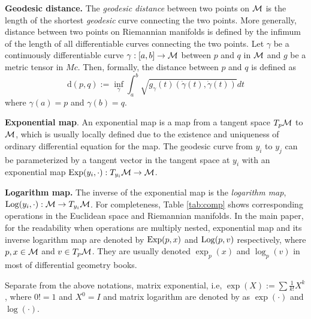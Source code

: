 \textbf{Geodesic distance.} The \textit{geodesic distance}
between two points on $\mathcal{M}$ is the length of the shortest {\em geodesic} curve connecting the two points. More generally, distance between two points on Riemannian manifolds is defined by the infimum of the length of all differentiable curves connecting the two points. Let $\gamma$ be a continuously differentiable curve $\gamma:[a,b] \rightarrow \mathcal{M}$ between $p$ and $q$ in $\mathcal{M}$ and $g$ be a metric tensor in $Mc$.
Then, formally, the distance between $p$ and $q$ is defined as
\begin{equation}
\text{d}(p,q) := \inf_\gamma \int_a^b \sqrt{g_\gamma(t) (\dot{\gamma}(t), \dot{\gamma}(t))} dt
\end{equation}
where $\gamma(a)=p$ and $\gamma(b)=q$.

\textbf{Exponential map}. An exponential map is a map from a tangent space $T_p\mathcal{M}$  to $\mathcal{M}$, which is usually locally defined due to the existence and uniqueness of ordinary differential equation for the map. The geodesic curve from $y_i$ to $y_j$ can be parameterized by a tangent vector in the tangent space at $y_i$ with an exponential map $\operatorname*{Exp}(y_i,\cdot ): T_{y_i}\mathcal{M} \rightarrow \mathcal{M}$. 


\textbf{Logarithm map.}
The inverse of the exponential map is the \textit{logarithm map}, $\operatorname*{Log}(y_i,\cdot):\mathcal{M} \rightarrow T_{y_i}\mathcal{M}$. 
For completeness, Table \ref{tab:comp} shows corresponding operations in the Euclidean space and Riemannian manifolds.
In the main paper, for the readability when operations are multiply nested, exponential map and its inverse logarithm map are denoted by $\operatorname*{Exp}(p, x)$ and $\operatorname*{Log}(p, v)$ respectively, where $p, x \in \mathcal{M}$ and $v\in T_p\mathcal{M}$. They are usually denoted $\exp_p(x)$ and $\log_p(v)$ in most of differential geometry books. 
 
Separate from the above notations, matrix exponential, i.e, $\exp(X):= \sum \frac{1}{k!} X^k$, where $0!=1$ and $X^0=I$  and matrix logarithm are denoted by as $\exp(\cdot)$ and $\log(\cdot)$. 


